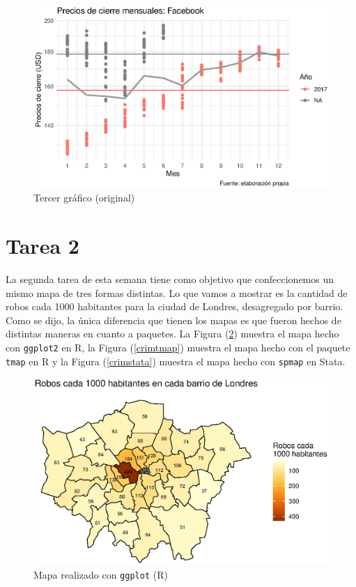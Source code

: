 \documentclass[12pt]{article}
\begin{document}
\begin{figure}[htbp]
    \centering
\includegraphics[width = \textwidth]{graficos/tercergrafico_modificado.eps}
    \caption{Tercer gráfico (original)}
    \label{terceromod}
\end{figure}






\newpage
\section*{Tarea 2}

La segunda tarea de esta semana tiene como objetivo que confeccionemos un mismo mapa de tres formas distintas. 
Lo que vamos a mostrar es la cantidad de robos cada 1000 habitantes para la ciudad de Londres, desagregado por barrio. Como se dijo, la \'unica diferencia que tienen los mapas es que fueron hechos de distintas maneras en cuanto a paquetes. La Figura (\ref{crimggplot}) muestra el mapa hecho con \texttt{ggplot2} en R, la Figura (\ref{crimtmap}) muestra el mapa hecho con el paquete \texttt{tmap} en R y la Figura (\ref{crimstata}) muestra el mapa hecho con \texttt{spmap} en Stata.

\begin{figure}[H]
    \centering
    \includegraphics[width = \textwidth]{graficos/mapa_ggplot.eps}
    \caption{Mapa realizado con \texttt{ggplot} (R)}
    \label{crimggplot}
\end{figure}
\end{document}
